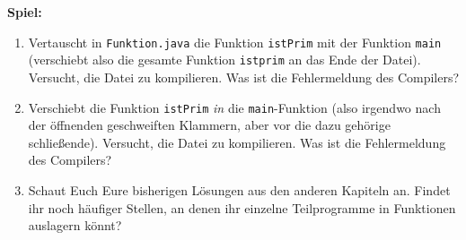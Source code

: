 \textbf{Spiel:}
\begin{enumerate}
\item Vertauscht in \texttt{Funktion.java} die Funktion \texttt{istPrim} mit
  der Funktion \texttt{main} (verschiebt also die gesamte Funktion
  \texttt{istprim} an das Ende der Datei). Versucht, die Datei zu
  kompilieren. Was ist die Fehlermeldung des Compilers?
\item Verschiebt die Funktion \texttt{istPrim} \emph{in} die
  \texttt{main}-Funktion (also irgendwo nach der öffnenden geschweiften
  Klammern, aber vor die dazu gehörige schließende). Versucht, die Datei zu
  kompilieren. Was ist die Fehlermeldung des Compilers?
\item Schaut Euch Eure bisherigen Lösungen aus den anderen Kapiteln an. Findet ihr noch häufiger
  Stellen, an denen ihr einzelne Teilprogramme in Funktionen auslagern könnt?
\end{enumerate}
